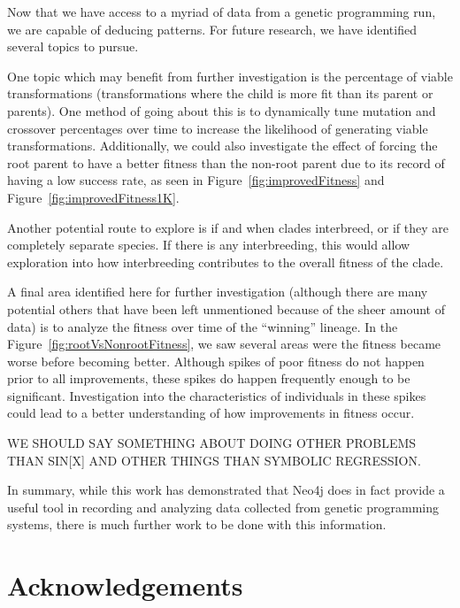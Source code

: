 \documentclass[12pt]{article}
\begin{document}
Now that we have access to a myriad of data from a genetic programming run, we are capable of deducing patterns. For future research, we have identified several topics to pursue.

One topic which may benefit from further investigation is the percentage of viable transformations (transformations where the child is more fit than its parent or parents). One method of going about this is to dynamically tune mutation and crossover percentages over time to increase the likelihood of generating viable transformations. Additionally, we could also investigate the effect of forcing the root parent to have a better fitness than the non-root parent due to its record of having a low success rate, as seen in Figure~\ref{fig:improvedFitness} and Figure~\ref{fig:improvedFitness1K}.

Another potential route to explore is if and when clades interbreed, or if they are completely separate species. If there is any interbreeding, this would allow exploration into how interbreeding contributes to the overall fitness of the clade. 

A final area identified here for further investigation (although there are many potential others that have been left unmentioned because of the sheer amount of data) is to analyze the fitness over time of the ``winning'' lineage. In the Figure~\ref{fig:rootVsNonrootFitness}, we saw several areas were the fitness became worse before becoming better. Although spikes of poor fitness do not happen prior to all improvements, these spikes do happen frequently enough to be significant. Investigation into the characteristics of individuals in these spikes could lead to a better understanding of how improvements in fitness occur.

WE SHOULD SAY SOMETHING ABOUT DOING OTHER PROBLEMS THAN SIN[X] AND OTHER THINGS THAN SYMBOLIC REGRESSION.

In summary, while this work has demonstrated that Neo4j does in fact provide a useful tool in recording and analyzing data collected from genetic programming systems, there is much further work to be done with this information.

\section*{Acknowledgements}



\end{document}
